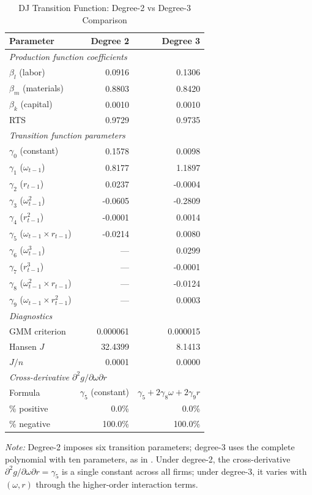 \documentclass[a4paper, 12pt]{article}
\begin{document}
\begin{table}[htbp]
\centering
\caption{DJ Transition Function: Degree-2 vs Degree-3 Comparison}
\label{tab:dj_degree_comparison}
\begin{tabular}{lrr}
\toprule
Parameter & Degree 2 & Degree 3 \\
\midrule
\multicolumn{3}{l}{\textit{Production function coefficients}} \\
  $\beta_l$ (labor)     & 0.0916 & 0.1306 \\
  $\beta_m$ (materials) & 0.8803 & 0.8420 \\
  $\beta_k$ (capital)   & 0.0010 & 0.0010 \\
  RTS                   & 0.9729 & 0.9735 \\
\midrule
\multicolumn{3}{l}{\textit{Transition function parameters}} \\
  $\gamma_0$ (constant) & 0.1578 & 0.0098 \\
  $\gamma_1$ ($\omega_{t-1}$) & 0.8177 & 1.1897 \\
  $\gamma_2$ ($r_{t-1}$) & 0.0237 & -0.0004 \\
  $\gamma_3$ ($\omega_{t-1}^2$) & -0.0605 & -0.2809 \\
  $\gamma_4$ ($r_{t-1}^2$) & -0.0001 & 0.0014 \\
  $\gamma_5$ ($\omega_{t-1} \times r_{t-1}$) & -0.0214 & 0.0080 \\
  $\gamma_6$ ($\omega_{t-1}^3$) & --- & 0.0299 \\
  $\gamma_7$ ($r_{t-1}^3$) & --- & -0.0001 \\
  $\gamma_8$ ($\omega_{t-1}^2 \times r_{t-1}$) & --- & -0.0124 \\
  $\gamma_9$ ($\omega_{t-1} \times r_{t-1}^2$) & --- & 0.0003 \\
\midrule
\multicolumn{3}{l}{\textit{Diagnostics}} \\
  GMM criterion     & 0.000061 & 0.000015 \\
  Hansen $J$        & 32.4399 & 8.1413 \\
  $J/n$             & 0.0001 & 0.0000 \\
\midrule
\multicolumn{3}{l}{\textit{Cross-derivative $\partial^2 g/\partial\omega\partial r$}} \\
  Formula            & $\gamma_5$ (constant) & $\gamma_5 + 2\gamma_8\omega + 2\gamma_9 r$ \\
  \% positive        & 0.0\% & 0.0\% \\
  \% negative        & 100.0\% & 100.0\% \\
\bottomrule
\end{tabular}
\begin{flushleft}
\footnotesize
\textit{Note:} Degree-2 imposes six transition parameters; degree-3 uses the
complete polynomial with ten parameters, as in \textcite{doraszelski2013r}.
Under degree-2, the cross-derivative $\partial^2 g/\partial\omega\partial r = \gamma_5$
is a single constant across all firms; under degree-3, it varies with
$(\omega, r)$ through the higher-order interaction terms.
\end{flushleft}
\end{table}
\end{document}
